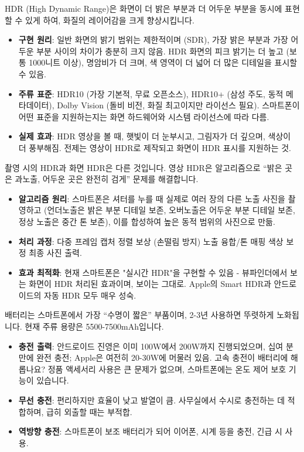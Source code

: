 
HDR (High Dynamic Range)은 화면이 더 밝은 부분과 더 어두운 부분을 동시에 표현할 수 있게 하여, 화질의 레이어감을 크게 향상시킵니다.

\begin{itemize}
  \item \textbf{구현 원리}: 일반 화면의 밝기 범위는 제한적이며 (SDR), 가장 밝은 부분과 가장 어두운 부분 사이의 차이가 충분히 크지 않음. HDR 화면의 피크 밝기는 더 높고 (보통 1000니트 이상), 명암비가 더 크며, 색 영역이 더 넓어 더 많은 디테일을 표시할 수 있음.
  \item \textbf{주류 표준}: HDR10 (가장 기본적, 무료 오픈소스), HDR10+ (삼성 주도, 동적 메타데이터), Dolby Vision (돌비 비전, 화질 최고이지만 라이선스 필요). 스마트폰이 어떤 표준을 지원하는지는 화면 하드웨어와 시스템 라이선스에 따라 다름.
  \item \textbf{실제 효과}: HDR 영상을 볼 때, 햇빛이 더 눈부시고, 그림자가 더 깊으며, 색상이 더 풍부해짐. 전제는 영상이 HDR로 제작되고 화면이 HDR 표시를 지원하는 것.
\end{itemize}


촬영 시의 HDR과 화면 HDR은 다른 것입니다. 영상 HDR은 알고리즘으로 “밝은 곳은 과노출, 어두운 곳은 완전히 검게” 문제를 해결합니다.

\begin{itemize}
  \item \textbf{알고리즘 원리}: 스마트폰은 셔터를 누를 때 실제로 여러 장의 다른 노출 사진을 촬영하고 (언더노출은 밝은 부분 디테일 보존, 오버노출은 어두운 부분 디테일 보존, 정상 노출은 중간 톤 보존), 이를 합성하여 높은 동적 범위의 사진으로 만듦.
  \item \textbf{처리 과정}: 다중 프레임 캡처 정렬 보상 (손떨림 방지) 노출 융합/톤 매핑 색상 보정 최종 사진 출력.
  \item \textbf{효과 최적화}: 현재 스마트폰은 "실시간 HDR"을 구현할 수 있음 - 뷰파인더에서 보는 화면이 HDR 처리된 효과이며, 보이는 그대로. Apple의 Smart HDR과 안드로이드의 자동 HDR 모두 매우 성숙.
\end{itemize}


배터리는 스마트폰에서 가장 “수명이 짧은” 부품이며, 2-3년 사용하면 뚜렷하게 노화됩니다. 현재 주류 용량은 5500-7500mAh입니다.

\begin{itemize}
  \item \textbf{충전 출력}: 안드로이드 진영은 이미 100W에서 200W까지 진행되었으며, 십여 분 만에 완전 충전; Apple은 여전히 20-30W에 머물러 있음. 고속 충전이 배터리에 해롭나요? 정품 액세서리 사용은 큰 문제가 없으며, 스마트폰에는 온도 제어 보호 기능이 있습니다.
  \item \textbf{무선 충전}: 편리하지만 효율이 낮고 발열이 큼. 사무실에서 수시로 충전하는 데 적합하며, 급히 외출할 때는 부적합.
  \item \textbf{역방향 충전}: 스마트폰이 보조 배터리가 되어 이어폰, 시계 등을 충전, 긴급 시 사용.
\end{itemize}

